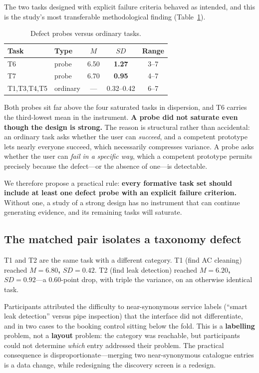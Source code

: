 \documentclass[conference]{IEEEtran}
\begin{document}
The two tasks designed with explicit failure criteria behaved as intended, and
this is the study's most transferable methodological finding
(Table~\ref{tab:probes}).

\begin{table}[t]
\caption{Defect probes versus ordinary tasks.}
\label{tab:probes}
\centering
\begin{tabular}{@{}llccc@{}}
\toprule
Task & Type & $M$ & $SD$ & Range \\
\midrule
T6 & probe      & 6.50 & \textbf{1.27} & 3--7 \\
T7 & probe      & 6.70 & \textbf{0.95} & 4--7 \\
T1,T3,T4,T5 & ordinary & --- & 0.32--0.42 & 6--7 \\
\bottomrule
\end{tabular}
\end{table}

Both probes sit far above the four saturated tasks in dispersion, and T6 carries
the third-lowest mean in the instrument. \textbf{A probe did not saturate even
though the design is strong.} The reason is structural rather than accidental:
an ordinary task asks whether the user can \emph{succeed}, and a competent
prototype lets nearly everyone succeed, which necessarily compresses variance.
A probe asks whether the user can \emph{fail in a specific way}, which a
competent prototype permits precisely because the defect---or the absence of
one---is detectable.

We therefore propose a practical rule: \textbf{every formative task set should
include at least one defect probe with an explicit failure criterion.} Without
one, a study of a strong design has no instrument that can continue generating
evidence, and its remaining tasks will saturate.

\subsection{The matched pair isolates a taxonomy defect}

T1 and T2 are the same task with a different category. T1 (find AC cleaning)
reached \textbf{$M=6.80$, $SD=0.42$}. T2 (find leak detection) reached
\textbf{$M=6.20$, $SD=0.92$}---a 0.60-point drop, with triple the variance, on
an otherwise identical task.

Participants attributed the difficulty to near-synonymous service labels
(``smart leak detection'' versus pipe inspection) that the interface did not
differentiate, and in two cases to the booking control sitting below the fold.
This is a \textbf{labelling} problem, not a \textbf{layout} problem: the
category was reachable, but participants could not determine \emph{which} entry
addressed their problem. The practical consequence is disproportionate---merging
two near-synonymous catalogue entries is a data change, while redesigning the
discovery screen is a redesign.
\end{document}

